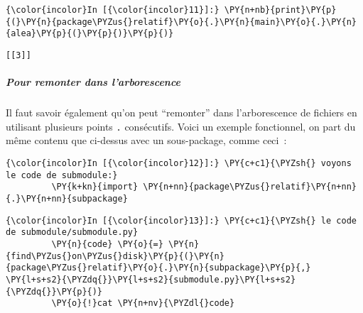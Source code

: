    \begin{Verbatim}[commandchars=\\\{\},frame=single,framerule=0.3mm,rulecolor=\color{cellframecolor}]
{\color{incolor}In [{\color{incolor}11}]:} \PY{n+nb}{print}\PY{p}{(}\PY{n}{package\PYZus{}relatif}\PY{o}{.}\PY{n}{main}\PY{o}{.}\PY{n}{alea}\PY{p}{(}\PY{p}{)}\PY{p}{)}
\end{Verbatim}


    \begin{Verbatim}[commandchars=\\\{\},frame=single,framerule=0.3mm,rulecolor=\color{cellframecolor}]
[[3]]
\end{Verbatim}

    \hypertarget{pour-remonter-dans-larborescence}{%
\subparagraph{Pour remonter dans
l'arborescence}\label{pour-remonter-dans-larborescence}}

    Il faut savoir également qu'on peut ``remonter'' dans l'arborescence de
fichiers en utilisant plusieurs points \texttt{.} consécutifs. Voici un
exemple fonctionnel, on part du même contenu que ci-dessus avec un
sous-package, comme ceci~:

    \begin{Shaded}
\begin{Highlighting}[frame=lines,framerule=0.6mm,rulecolor=\color{asisframecolor}]
\end{Highlighting}
\end{Shaded}

    \begin{Verbatim}[commandchars=\\\{\},frame=single,framerule=0.3mm,rulecolor=\color{cellframecolor}]
{\color{incolor}In [{\color{incolor}12}]:} \PY{c+c1}{\PYZsh{} voyons le code de submodule:}
         \PY{k+kn}{import} \PY{n+nn}{package\PYZus{}relatif}\PY{n+nn}{.}\PY{n+nn}{subpackage}
\end{Verbatim}


    \begin{Verbatim}[commandchars=\\\{\},frame=single,framerule=0.3mm,rulecolor=\color{cellframecolor}]
{\color{incolor}In [{\color{incolor}13}]:} \PY{c+c1}{\PYZsh{} le code de submodule/submodule.py}
         \PY{n}{code} \PY{o}{=} \PY{n}{find\PYZus{}on\PYZus{}disk}\PY{p}{(}\PY{n}{package\PYZus{}relatif}\PY{o}{.}\PY{n}{subpackage}\PY{p}{,} \PY{l+s+s2}{\PYZdq{}}\PY{l+s+s2}{submodule.py}\PY{l+s+s2}{\PYZdq{}}\PY{p}{)}
         \PY{o}{!}cat \PY{n+nv}{\PYZdl{}code}
\end{Verbatim}


